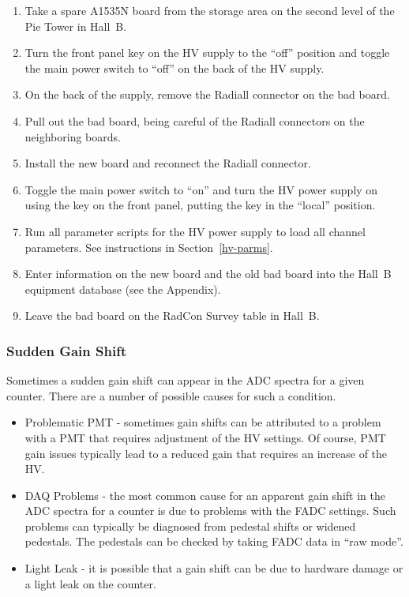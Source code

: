 \documentclass[letterpaper,10pt]{article}
\begin{document}
\begin{enumerate}
\item Take a spare A1535N board from the storage area on the second level of the Pie Tower in Hall~B.
\item Turn the front panel key on the HV supply to the ``off'' position and toggle the main power 
switch to ``off'' on the back of the HV supply.
\item On the back of the supply, remove the Radiall connector on the bad board.
\item Pull out the bad board, being careful of the Radiall connectors on the neighboring boards.
\item Install the new board and reconnect the Radiall connector.
\item Toggle the main power switch to ``on'' and turn the HV power supply on using the key on the front 
panel, putting the key in the ``local'' position.
\item Run all parameter scripts for the HV power supply to load all channel parameters. See instructions
in Section~\ref{hv-parms}.
\item Enter information on the new board and the old bad board into the Hall~B equipment database (see
the Appendix).
\item Leave the bad board on the RadCon Survey table in Hall~B.
\end{enumerate}

\subsubsection{Sudden Gain Shift}
\label{gain-shift}

Sometimes a sudden gain shift can appear in the ADC spectra for a given counter. There are a number of
possible causes for such a condition.

\begin{itemize}
\item Problematic PMT - sometimes gain shifts can be attributed to a problem with a PMT that requires 
adjustment of the HV settings. Of course, PMT gain issues typically lead to a reduced gain that requires 
an increase of the HV. 
\item DAQ Problems - the most common cause for an apparent gain shift in the ADC spectra for a counter is 
due to problems with the FADC settings. Such problems can typically be diagnosed from pedestal shifts or 
widened pedestals. The pedestals can be checked by taking FADC data in ``raw mode''.
\item Light Leak - it is possible that a gain shift can be due to hardware damage or a light leak on the 
counter.
\end{itemize}
\end{document}
